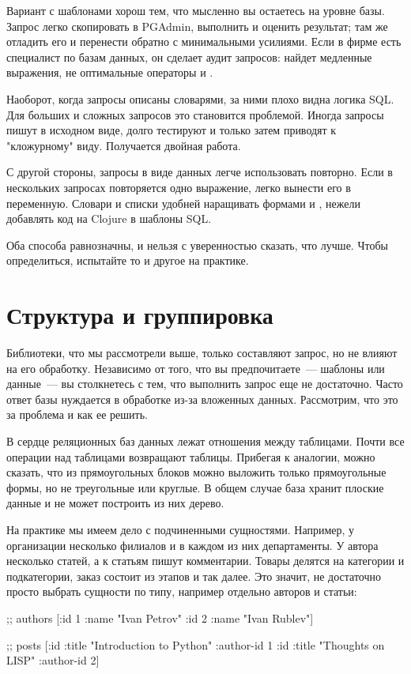 Вариант с шаблонами хорош тем, что мысленно вы остаетесь на уровне базы. Запрос легко скопировать в PGAdmin, выполнить и оценить результат; там же отладить его и перенести обратно с минимальными усилиями. Если в фирме есть специалист по базам данных, он сделает аудит запросов: найдет медленные выражения, не оптимальные операторы  и .

Наоборот, когда запросы описаны словарями, за ними плохо видна логика SQL. Для больших и сложных запросов это становится проблемой. Иногда запросы пишут в исходном виде, долго тестируют и только затем приводят к "кложурному" виду. Получается двойная работа.

С другой стороны, запросы в виде данных легче использовать повторно. Если в нескольких запросах повторяется одно выражение, легко вынести его в переменную. Словари и списки удобней наращивать формами  и , нежели добавлять код на Clojure в шаблоны SQL.

Оба способа равнозначны, и нельзя с уверенностью сказать, что лучше. Чтобы определиться, испытайте то и другое на практике.

\section{Структура и группировка}

Библиотеки, что мы рассмотрели выше, только составляют запрос, но не влияют на его обработку. Независимо от того, что вы предпочитаете~--- шаблоны или данные~--- вы столкнетесь с тем, что выполнить запрос еще не достаточно. Часто ответ базы нуждается в обработке из-за вложенных данных. Рассмотрим, что это за проблема и как ее решить.

В сердце реляционных баз данных лежат отношения между таблицами. Почти все операции над таблицами возвращают таблицы. Прибегая к аналогии, можно сказать, что из прямоугольных блоков можно выложить только прямоугольные формы, но не треугольные или круглые. В общем случае база хранит плоские данные и не может построить из них дерево.

На практике мы имеем дело с подчиненными сущностями. Например, у организации несколько филиалов и в каждом из них департаменты. У автора несколько статей, а к статьям пишут комментарии. Товары делятся на категории и подкатегории, заказ состоит из этапов и так далее. Это значит, не достаточно просто выбрать сущности по типу, например отдельно авторов и статьи:

\begin{english}
  \begin{clojure}
;; authors
[{:id 1 :name "Ivan Petrov"}
 {:id 2 :name "Ivan Rublev"}]

;; posts
[{:id :title "Introduction to Python" :author-id 1}
 {:id :title "Thoughts on LISP" :author-id 2}]
  \end{clojure}
\end{english}

